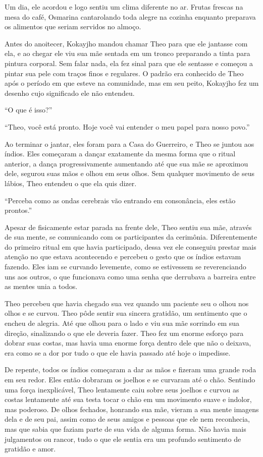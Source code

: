 Um dia, ele acordou e logo sentiu um clima diferente no ar. Frutas
frescas na mesa do café, Osmarina cantarolando toda alegre na cozinha
enquanto preparava os alimentos que seriam servidos no almoço.

Antes do anoitecer, Kokayjho mandou chamar Theo para que ele jantasse
com ela, e ao chegar ele viu sua mãe sentada em um tronco preparando a
tinta para pintura corporal. Sem falar nada, ela fez sinal para que ele
sentasse e começou a pintar sua pele com traços finos e regulares. O
padrão era conhecido de Theo após o período em que esteve na comunidade,
mas em seu peito, Kokayjho fez um desenho cujo significado ele não entendeu.

``O que é isso?''

``Theo, você está pronto. Hoje você vai entender o meu papel para nosso
povo.''

Ao terminar o jantar, eles foram para a Casa do Guerreiro, e Theo se
juntou aos índios. Eles começaram a dançar exatamente da mesma forma que
o ritual anterior, a dança progressivamente aumentando até que sua
mãe se aproximou dele, segurou suas mãos e olhou em seus olhos. Sem
qualquer movimento de seus lábios, Theo entendeu o que ela quis dizer.

``Perceba como as ondas cerebrais vão entrando em consonância, eles estão
prontos.''

Apesar de fisicamente estar parada na frente dele, Theo sentiu sua mãe,
através de sua mente, se comunicando com os participantes da cerimônia.
Diferentemente do primeiro ritual em que havia participado, dessa vez
ele conseguiu prestar mais atenção no que estava acontecendo e percebeu
o gesto que os índios estavam fazendo. Eles iam se curvando levemente,
como se estivessem se reverenciando uns aos outros, o que funcionava
como uma senha que derrubava a barreira entre as mentes unia a todos.

Theo percebeu que havia chegado sua vez quando um paciente seu o olhou
nos olhos e se curvou. Theo pôde sentir sua sincera gratidão, um
sentimento que o encheu de alegria. Até que olhou para o lado e viu sua
mãe sorrindo em sua direção, sinalizando o que ele deveria fazer. Theo
fez um enorme esforço para dobrar suas costas, mas havia uma enorme
força dentro dele que não o deixava, era como se a dor por tudo o que
ele havia passado até hoje o impedisse.

De repente, todos os índios começaram a dar as mãos e fizeram uma grande
roda em seu redor. Eles então dobraram os joelhos e se curvaram até o
chão. Sentindo uma força inexplicável, Theo lentamente caiu sobre seus
joelhos e curvou as costas lentamente até sua testa tocar o chão em um
movimento suave e indolor, mas poderoso. De olhos fechados, honrando sua
mãe, vieram a sua mente imagens dela e de seu pai, assim como de seus
amigos e pessoas que ele nem reconhecia, mas que sabia que faziam parte de
sua vida de alguma forma. Não havia mais julgamentos ou rancor, tudo o
que ele sentia era um profundo sentimento de gratidão e amor.

